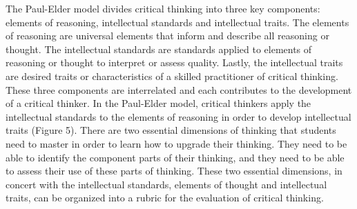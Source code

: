 The Paul-Elder model divides critical thinking into three key components: elements of reasoning, intellectual standards and intellectual traits. The elements of reasoning are universal elements that inform and describe all reasoning or thought. The intellectual standards are standards applied to elements of reasoning or thought to interpret or assess quality. Lastly, the intellectual traits are desired traits or characteristics of a skilled practitioner of critical thinking. These three components are interrelated and each contributes to the development of a critical thinker. In the Paul-Elder model, critical thinkers apply the intellectual standards to the elements of reasoning in order to develop intellectual traits (Figure 5). There are two essential dimensions of thinking that students need to master in order to learn how to upgrade their thinking. They need to be able to identify the component parts of their thinking, and they need to be able to assess their use of these parts of thinking. These two essential dimensions, in concert with the intellectual standards, elements of thought and intellectual traits, can be organized into a rubric for the evaluation of critical thinking\cite{Ralston:2010vh, Ralston:2011kh}.
